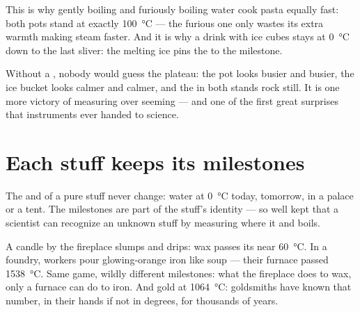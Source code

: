 \begin{example}\label{ex:g4:changes-of-state:kitchen}
This is why gently boiling and furiously boiling water cook pasta
equally fast: both pots stand at exactly \qty{100}{\celsius} --- the
furious one only wastes its extra warmth making steam faster. And
it is why a drink with ice cubes stays at \qty{0}{\celsius} down to
the last sliver: the melting ice pins the  to the
milestone.
\end{example}

\begin{remark}\label{rem:g4:changes-of-state:invisible}
Without a , nobody would guess the plateau: the pot looks
busier and busier, the ice bucket looks calmer and calmer, and the
 in both stands rock still. It is one more victory of
measuring over seeming --- and one of the first great surprises that
instruments ever handed to science.
\end{remark}

\section{Each stuff keeps its milestones}

\begin{proposition}\label{prop:g4:changes-of-state:identity}
The  and  of a pure stuff never change:
water  at \qty{0}{\celsius} today, tomorrow, in a palace or a
tent. The milestones are part of the stuff's identity --- so well
kept that a scientist can recognize an unknown stuff by measuring
where it  and boils.
\end{proposition}

\begin{example}\label{ex:g4:changes-of-state:foundry}
A candle by the fireplace slumps and drips: wax passes its  near \qty{60}{\celsius}. In a foundry, workers pour
glowing-orange  iron like soup --- their furnace passed
\qty{1538}{\celsius}. Same game, wildly different milestones: what
the fireplace does to wax, only a furnace can do to iron. And gold
 at \qty{1064}{\celsius}: goldsmiths have known that number,
in their hands if not in degrees, for thousands of years.
\end{example}

